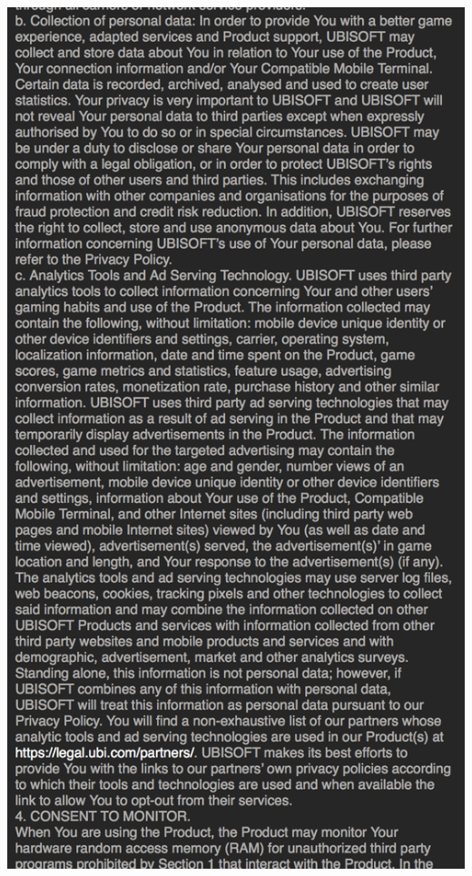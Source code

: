 \begin{frame}
\begin{columns}
\begin{column}{0.48\textwidth}
			\includegraphics[height=\textheight]{watch_dogs_2_eula}
		\end{column}
	\end{columns}
\end{frame}


